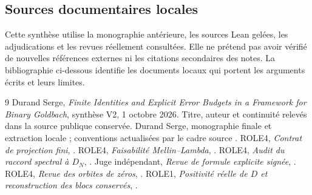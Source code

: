 \documentclass[11pt,a4paper]{article}
\theoremstyle{remark}
\begin{document}
\subsection*{Sources documentaires locales}
Cette synthèse utilise la monographie antérieure, les sources Lean gelées,
les adjudications et les revues réellement consultées. Elle ne prétend pas
avoir vérifié de nouvelles références externes ni les citations secondaires
des notes. La bibliographie ci-dessous identifie les documents locaux qui
portent les arguments écrits et leurs limites.
\begin{thebibliography}{9}\small
{} Durand Serge, \emph{Finite Identities and Explicit Error Budgets
in a Framework for Binary Goldbach}, synthèse V2, 1 octobre 2026.
Titre, auteur et continuité relevés dans la source publique conservée.
 Durand Serge, monographie finale et extraction locale
 ; conventions actualisées par le cadre source
.
 ROLE4, \emph{Contrat de projection fini},
.
 ROLE4, \emph{Faisabilité Mellin--Lambda},
.
 ROLE4, \emph{Audit du raccord spectral à $D_N$},
.
 Juge indépendant, \emph{Revue de formule explicite signée},
.
 ROLE4, \emph{Revue des orbites de zéros},
.
 ROLE1, \emph{Positivité réelle de $D$ et reconstruction
des blocs conservés},
.
\end{thebibliography}
\end{document}
